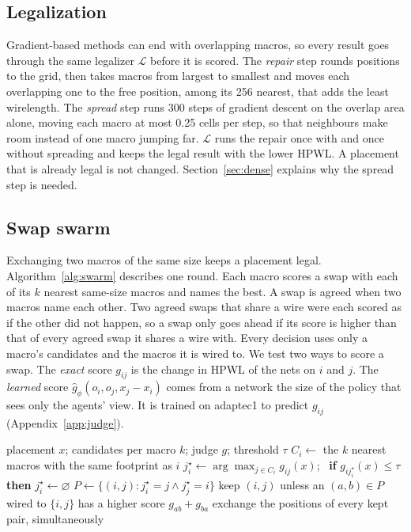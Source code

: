 \documentclass[10pt]{article}
\begin{document}
\subsection{Legalization}\label{sec:legalize}
Gradient-based methods can end with overlapping macros, so every result goes through the same legalizer $\mathcal{L}$ before it is scored. The \emph{repair} step rounds positions to the grid, then takes macros from largest to smallest and moves each overlapping one to the free position, among its 256 nearest, that adds the least wirelength. The \emph{spread} step runs 300 steps of gradient descent on the overlap area alone, moving each macro at most 0.25 cells per step, so that neighbours make room instead of one macro jumping far. $\mathcal{L}$ runs the repair once with and once without spreading and keeps the legal result with the lower HPWL. A placement that is already legal is not changed. Section~\ref{sec:dense} explains why the spread step is needed.

\subsection{Swap swarm}\label{sec:swarm-method}
Exchanging two macros of the same size keeps a placement legal. Algorithm~\ref{alg:swarm} describes one round. Each macro scores a swap with each of its $k$ nearest same-size macros and names the best. A swap is agreed when two macros name each other. Two agreed swaps that share a wire were each scored as if the other did not happen, so a swap only goes ahead if its score is higher than that of every agreed swap it shares a wire with. Every decision uses only a macro's candidates and the macros it is wired to. We test two ways to score a swap. The \emph{exact} score $g_{ij}$ is the change in HPWL of the nets on $i$ and $j$. The \emph{learned} score $\hat g_\phi(o_i,o_j,x_j-x_i)$ comes from a network the size of the policy that sees only the agents' view. It is trained on adaptec1 to predict $g_{ij}$ (Appendix~\ref{app:judge}).

\begin{algorithm}[t]
\caption{One round of the swap swarm. Every step runs on all macros in parallel.}\label{alg:swarm}
\begin{algorithmic}[1]
\Require placement $x$; candidates per macro $k$; judge $g$; threshold $\tau$
  \State $C_i \gets$ the $k$ nearest macros with the same footprint as $i$
  \State $j_i^\star \gets \arg\max_{j\in C_i} g_{ij}(x)$; \ \textbf{if} $g_{ij_i^\star}(x)\le\tau$ \textbf{then} $j_i^\star\gets\varnothing$
\EndFor
\State $P\gets\{(i,j): j_i^\star=j \wedge j_j^\star=i\}$ 
  \State keep $(i,j)$ unless an $(a,b)\in P$ wired to $\{i,j\}$ has a higher score $g_{ab}{+}g_{ba}$ 
\EndFor
\State exchange the positions of every kept pair, simultaneously
\end{algorithmic}
\end{algorithm}
\end{document}

